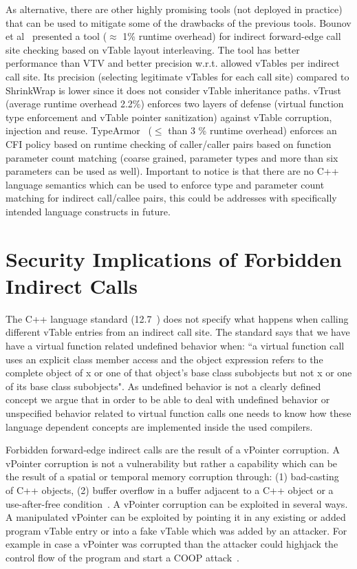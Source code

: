 As alternative, there are other highly promising tools (not deployed in practice) that can be used to mitigate 
some of the drawbacks of the previous tools. 
Bounov et al~\cite{bounov:interleaving} presented a tool ($\approx$ 1\% runtime overhead)
for indirect forward-edge call site checking based on vTable layout interleaving. The tool has better performance
than VTV and better precision w.r.t. allowed vTables per indirect call site. Its precision (selecting legitimate vTables for each call site)
compared to ShrinkWrap is lower since it does not consider vTable inheritance paths.
vTrust~\cite{zhang:vtrust} (average runtime overhead 2.2\%) enforces two layers of defense (virtual function type enforcement and vTable pointer sanitization)
against vTable corruption, injection and reuse.
TypeArmor~\cite{veen:typearmor} ($\le$ than 3 \% runtime overhead) enforces an CFI policy based on runtime checking of caller/caller pairs based
on function parameter count matching (coarse grained, parameter types and more than six parameters can be used as well).
Important to notice is that there are no C++ language semantics which can be used to enforce type and 
parameter count matching for indirect call/callee pairs, this could be addresses with specifically intended language constructs in future.

\section{Security Implications of Forbidden Indirect Calls}
\label{Security Implications of Forbidden Forward Indirect Calls}
The C++ language standard (12.7~\cite{iso:iecN3690}) does not specify
what happens when calling different vTable entries from an indirect call site.
The standard says that we have have a virtual function related undefined behavior when:
``a virtual function call uses an explicit class member access and the object expression refers to the complete
object of x or one of that object’s base class subobjects but not x or one of its base class subobjects".
As undefined behavior is not a clearly defined concept we argue that in order to be able to deal
with undefined behavior or  unspecified behavior related to virtual function calls one needs to know
how these language dependent concepts are implemented inside the used compilers.

Forbidden forward-edge indirect calls are the result of a vPointer corruption.
A vPointer corruption is not a vulnerability but rather a capability which 
can be the result of a spatial or temporal memory corruption through: 
(1) bad-casting~\cite{byoungyoung:typecasting} of C++ objects, 
(2) buffer overflow in a buffer adjacent to a C++ object or a use-after-free condition~\cite{schuster:coop}.
A vPointer corruption can be exploited in several ways. A manipulated vPointer
can be exploited by pointing it in any existing or added program vTable entry 
or into a fake vTable which was added by an attacker. For example in case a vPointer
was corrupted than the attacker could highjack the control flow of the program 
and start a COOP attack~\cite{schuster:coop}.

